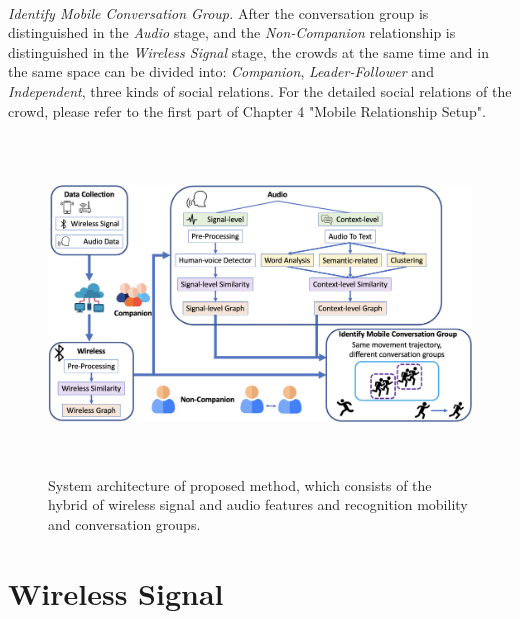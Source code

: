 \documentclass[a4paper,12pt]{report}
\begin{document}
\paragraph{}
\emph{Identify Mobile Conversation Group.} After the conversation group is distinguished in the \emph{Audio} stage, and the \emph{Non-Companion} relationship is distinguished in the \emph{Wireless Signal} stage, the crowds at the same time and in the same space can be divided into: \emph{Companion}, \emph{Leader-Follower} and \emph{Independent}, three kinds of social relations. For the detailed social relations of the crowd, please refer to the first part of Chapter 4 "Mobile Relationship Setup".
\\
\begin{figure}[btph]
\begin{center}
\includegraphics[width=6.3in,height=3.5in]{images and data/System_Architecture_Yun.png}
\caption{System architecture of proposed method, which consists of the hybrid of wireless signal and audio features and recognition mobility and conversation groups.}
\label{f:system_model}
\end{center}
\end{figure}
\section{Wireless Signal}
\end{document}
